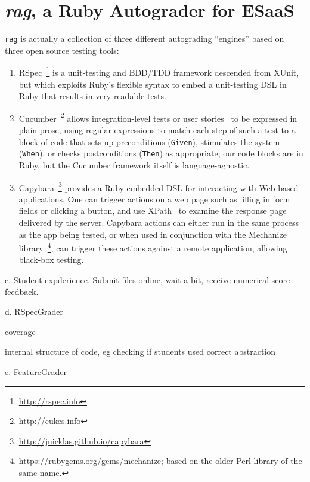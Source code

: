 \section{\emph{rag}, a Ruby Autograder for ESaaS}

\texttt{rag} is actually a collection of three different autograding
``engines'' based on three open source testing
tools:
\begin{enumerate}

\item RSpec~\footnote{\url{http://rspec.info}} is a unit-testing and
BDD/TDD framework descended from XUnit, but which exploits Ruby's
flexible syntax to embed a unit-testing DSL in Ruby that results in very
readable tests.  

\item Cucumber~\footnote{\url{http://cukes.info}} allows
integration-level tests or user stories~\cite{user-stories} to be
expressed in plain prose, using regular expressions to match each step
of such a test to a block of code that sets up preconditions (\texttt{Given}), stimulates
the system (\texttt{When}), or checks postconditions (\texttt{Then}) as
appropriate; our code blocks are in Ruby, but the Cucumber framework
itself is language-agnostic.  

\item Capybara~\footnote{\url{http://jnicklas.github.io/capybara}}
provides a Ruby-embedded DSL for interacting with Web-based
applications.
One can trigger actions on a web page such as filling in form fields
or clicking a button, and use XPath~\cite{xpath} to examine the
response page delivered by the server.
Capybara actions can either run in the same process as the app being
tested, or when used in conjunction with the Mechanize
library~\footnote{\url{https://rubygems.org/gems/mechanize}; based on
  the older Perl library of the same name.}, can trigger these actions
against a remote application, allowing black-box testing.

\end{enumerate}




c.	Student expderience. Submit files online, wait a bit, receive numerical score + feedback.

d.	RSpecGrader

coverage

internal structure of code, eg checking if students used correct
abstraction 



e.	FeatureGrader


